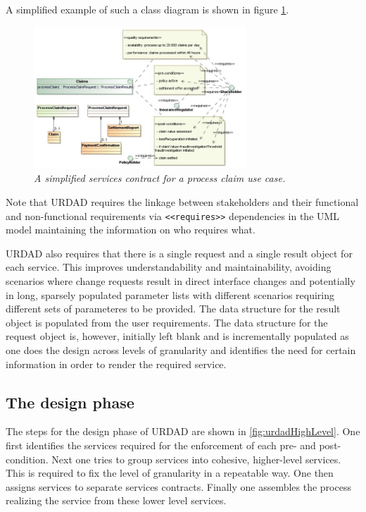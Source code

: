 A simplified example of such a class diagram is shown in figure 
\ref{fig:servicesContract}.

\begin{figure}[ht!]
  \begin{center}
    \includegraphics[width=8cm]{servicesContract}
    \caption{\it A simplified services contract for a process claim use case.}
    \label{fig:servicesContract}
  \end{center}
\end{figure}

Note that URDAD requires the linkage between stakeholders and their functional and non-functional
requirements via \verb+<<requires>>+ dependencies in the UML model maintaining the information on
who requires what.

URDAD also requires that there is a single request and a single result object for each service. This
improves understandability and maintainability, avoiding scenarios where change requests result in
direct interface changes and potentially in long, sparsely populated parameter lists with different
scenarios requiring different sets of parameteres to be provided. The data structure for the result
object is populated from the user requirements. The data structure for the request object is, however,
initially left blank and is incrementally populated as one does the design across levels of granularity 
and identifies the need for certain information in order to render the required service.


\subsection{The design phase}

The steps for the design phase of URDAD are shown in  \ref{fig:urdadHighLevel}.
One first identifies the services required for the enforcement of each pre- and post-condition.
Next one tries to group services into cohesive, higher-level services. This is required to fix 
the level of granularity in a repeatable way. One then assigns services to separate services
contracts. Finally one assembles the process realizing the service from these lower level services.


